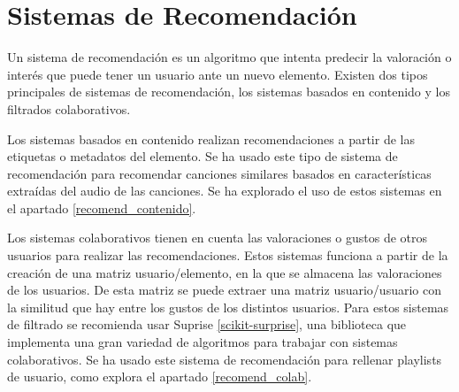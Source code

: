 \section{Sistemas de Recomendación}
Un sistema de recomendación es un algoritmo que intenta predecir la valoración o interés que puede tener un usuario ante un nuevo elemento. Existen dos tipos principales de sistemas de recomendación, los sistemas basados en contenido y los filtrados colaborativos. 

Los sistemas basados en contenido realizan recomendaciones a partir de las etiquetas o metadatos del elemento. Se ha usado este tipo de sistema de recomendación para recomendar canciones similares basados en características extraídas del audio de las canciones. Se ha explorado el uso de estos sistemas en el apartado \ref{recomend_contenido}.

Los sistemas colaborativos tienen en cuenta las valoraciones o gustos de otros usuarios para realizar las recomendaciones.
Estos sistemas funciona a partir de la creación de una matriz usuario/elemento, en la que se almacena las valoraciones de los usuarios. De esta matriz se puede extraer una matriz usuario/usuario con la similitud que hay entre los gustos de los distintos usuarios. Para estos sistemas de filtrado se recomienda usar Suprise \ref{scikit-surprise}, una biblioteca que implementa una gran variedad de algoritmos para trabajar con sistemas colaborativos. Se ha usado este sistema de recomendación para rellenar playlists de usuario, como explora el apartado \ref{recomend_colab}.